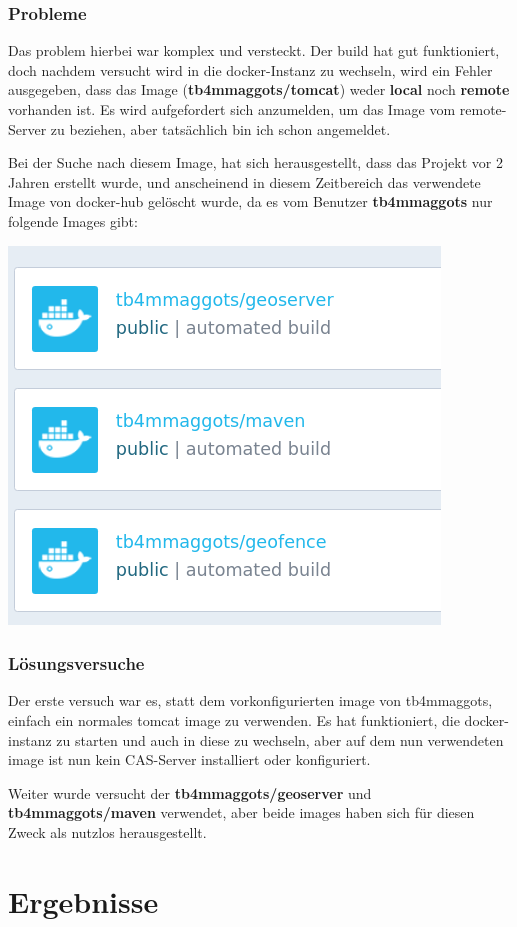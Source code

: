 \subsubsection{Probleme}
Das problem hierbei war komplex und versteckt. Der build hat gut funktioniert, doch nachdem versucht wird in die docker-Instanz zu wechseln, wird ein Fehler ausgegeben, dass das Image (\textbf{tb4mmaggots/tomcat}) weder \textbf{local} noch \textbf{remote} vorhanden ist. Es wird aufgefordert sich anzumelden, um das Image vom remote-Server zu beziehen, aber tatsächlich bin ich schon angemeldet. 

Bei der Suche nach diesem Image, hat sich herausgestellt, dass das Projekt vor 2 Jahren erstellt wurde, und anscheinend in diesem Zeitbereich das verwendete Image von docker-hub gelöscht wurde, da es vom Benutzer \textbf{tb4mmaggots} nur folgende Images gibt:

\begin{minipage}{\linewidth}
	\centering
	\includegraphics[width=0.5\linewidth]{images/failed_3}
\end{minipage}

\subsubsection{Lösungsversuche}
Der erste versuch war es, statt dem vorkonfigurierten image von tb4mmaggots, einfach ein normales tomcat image zu verwenden. Es hat funktioniert, die docker-instanz zu starten und auch in diese zu wechseln, aber auf dem nun verwendeten image ist nun kein CAS-Server installiert oder konfiguriert. 

Weiter wurde versucht der \textbf{tb4mmaggots/geoserver} und \textbf{tb4mmaggots/maven} verwendet, aber beide images haben sich für diesen Zweck als nutzlos herausgestellt.

\section{Ergebnisse}
\label{sec:Ergebnisse}
